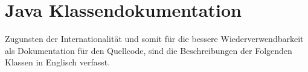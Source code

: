 \chapter{Java Klassendokumentation}
Zugunsten der Internationalität und somit für die bessere Wiederverwendbarkeit als Dokumentation für den Quellcode, sind die Beschreibungen der Folgenden Klassen in Englisch verfasst.


